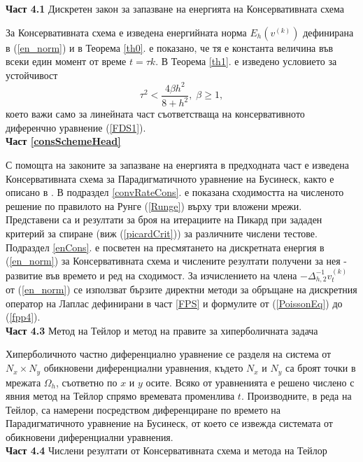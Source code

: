 \documentclass[a5paper]{article}
\newcommand{\be}{\begin{equation}}
\newcommand{\ee}{\end{equation}}
\newcommand{\rf}[1]{(\ref{#1})}
\theoremstyle{remark}
\begin{document}
\begin{normalsize}
\textbf{Част 4.1} Дискретен закон за запазване на енергията на Консервативната схема

За Консервативната схема е изведена енергийната норма $E_h(v^{(k)})$ дефинирана в \rf{en_norm} и в Теорема \ref{th0}. е показано, че тя е константа величина във всеки един момент от време $t=\tau k$. В Теорема \ref{th1}. е изведено условието за устойчивост
\be
\tau^2 < \frac{ 4 \beta h^2 } { 8 + h^2}, \; \beta \ge 1,
\ee 
което важи само за линейната част съответстваща на консервативното диференчно уравнение \rf{FDS1}.\\

\textbf{Част \ref{consSchemeHead}}

С помощта на законите за запазване на енергията в предходната част е изведена Консервативната схема за Парадигматичното уравнение на Бусинеск, както е описано в \cite{ref25}. В подраздел \ref{convRateCons}. е показана сходимостта на численото решение по правилото на Рунге \rf{Runge} върху три вложени мрежи. Представени са и резултати за броя на итерациите на Пикард при зададен критерий за спиране (виж \rf{picardCrit}) за различните числени тестове. Подраздел \ref{enCons}. е посветен на пресмятането на дискретната енергия в \rf{en_norm} за Консервативната схема и числените резултати получени за нея - развитие във времето и ред на сходимост. За изчислението на члена $-\Delta_{h,2}^{-1}v_{t}^{(k)}$ от \rf{en_norm} се използват бързите директни методи за обръщане на дискретния оператор на Лаплас дефинирани в част \ref{FPS} и формулите от \rf{PoissonEq} до \rf{fpp4}.\\

\textbf{Част 4.3} Метод на Тейлор и метод на правите за хиперболичната задача

Хиперболичното частно диференциално уравнение се разделя на система от $N_x \times N_y$ обикновени диференциални уравнения, където $N_x$ и $N_y$ са броят точки в мрежата $\Omega_h$, съответно по $x$ и $y$ осите. Всяко от уравненията е решено числено с явния метод на Тейлор спрямо времевата променлива $t$. Производните, в реда на Тейлор, са намерени посредством диференциране по времето на Парадигматичното уравнение на Бусинеск, от което се извежда системата от обикновени диференциални уравнения.\\

\textbf{Част 4.4} Числени резултати от Консервативната схема и метода на Тейлор


\end{normalsize}
\end{document}

